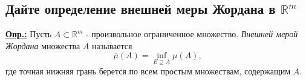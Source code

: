 
\subsection{Дайте определение внешней меры Жордана в $\mathbb{R}^m$}

\textbf{\underline{Опр.:} } Пусть $A \subset \mathbb{R}^m$ - произвольное ограниченное множество. \textit{Внешней мерой Жордана} множества $A$ называется
$$\overline{\mu}(A) = \inf\limits_{E\supseteq A}\mu(A),$$
где точная нижняя грань берется по всем простым множествам, содержащим $A$.



